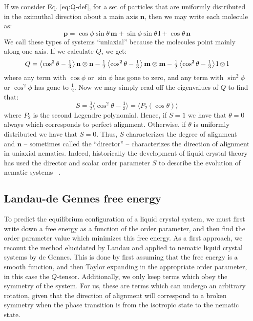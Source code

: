 \documentclass[reqno]{article}
\begin{document}
  If we consider Eq. \eqref{eq:Q-def}, for a set of particles that are uniformly
  distributed in the azimuthal direction about a main axis $\mathbf{n}$, then we may
  write each molecule as:
  \begin{equation}
    \mathbf{p}
    =
    \cos\phi \sin\theta \, \mathbf{m}
    + \sin\phi \sin\theta \, \mathbf{l}
    + \cos\theta \, \mathbf{n}
  \end{equation}
  We call these types of systems ``uniaxial'' because the molecules point mainly
  along one axis.
  If we calculate $Q$, we get:
  \begin{equation} \label{eq:uniaxial-Q-decomposition}
      Q
      = 
      \left< \cos^2 \theta - \tfrac13 \right> \mathbf{n} \otimes \mathbf{n}
      - \tfrac12 \left< \cos^2\theta - \tfrac13 \right> \mathbf{m} \otimes \mathbf{m}
      - \tfrac12 \left< \cos^2\theta - \tfrac13 \right> \mathbf{l} \otimes \mathbf{l}\\
  \end{equation}
  where any term with $\cos\phi$ or $\sin\phi$ has gone to zero, and any term
  with $\sin^2\phi$ or $\cos^2\phi$ has gone to $\tfrac12$.
  Now we may simply read off the eigenvalues of $Q$ to find that:
  \begin{equation}
    S
    = \tfrac32 \langle \cos^2 \theta - \tfrac13 \rangle
    = \langle P_2(\cos\theta) \rangle
  \end{equation}
  where $P_2$ is the second Legendre polynomial.
  Hence, if $S = 1$ we have that $\theta = 0$ always which corresponds to
  perfect alignment.
  Otherwise, if $\theta$ is uniformly distributed we have that $S = 0$.
  Thus, $S$ characterizes the degree of alignment and $\mathbf{n}$ -- sometimes called
  the ``director'' -- characterizes the direction of alignment in uniaxial
  nematics.
  Indeed, historically the development of liquid crystal theory has used the
  director and scalar order parameter $S$ to describe the evolution of nematic
  systems ~\cite{ericksen_hydrostatic_1962, ericksen_liquid_1991}.
  
  \subsection{Landau-de Gennes free energy}
  To predict the equilibrium configuration of a liquid crystal system, we must
  first write down a free energy as a function of the order parameter, and then
  find the order parameter value which minimizes this free energy.
  As a first approach, we recount the method elucidated by Landau and applied to
  nematic liquid crystal systems by de Gennes.
  This is done by first assuming that the free energy is a smooth function, and
  then Taylor expanding in the appropriate order parameter, in this case the
  $Q$-tensor.
  Additionally, we only keep terms which obey the symmetry of the system.
  For us, these are terms which can undergo an arbitrary rotation, given that
  the direction of alignment will correspond to a broken symmetry when the phase
  transition is from the isotropic state to the nematic state.
\end{document}
